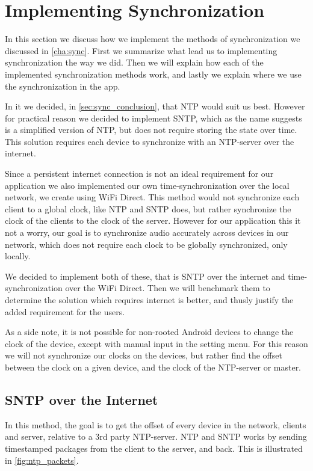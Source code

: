 \section{Implementing Synchronization}\label{sec:impl_sync}
In this section we discuss how we implement the methods of synchronization we discussed in \cref{cha:sync}.
First we summarize what lead us to implementing synchronization the way we did.
Then we will explain how each of the implemented synchronization methods work, and lastly we explain where we use the synchronization in the app.

In it we decided, in \cref{sec:sync_conclusion}, that NTP would suit us best.
However for practical reason we decided to implement \ac{SNTP}, which as the name suggests is a simplified version of \ac{NTP}, but does not require storing the state over time.
This solution requires each device to synchronize with an \ac{NTP}-server over the internet.

Since a persistent internet connection is not an ideal requirement for our application we also implemented our own time-synchronization over the local network, we create using WiFi Direct.
This method would not synchronize each client to a global clock, like \ac{NTP} and \ac{SNTP} does, but rather synchronize the clock of the clients to the clock of the server.
However for our application this it not a worry, our goal is to synchronize audio accurately across devices in our network, which does not require each clock to be globally synchronized, only locally.

We decided to implement both of these, that is \ac{SNTP} over the internet and time-synchronization over the WiFi Direct.
Then we will benchmark them to determine the solution which requires internet is better, and thusly justify the added requirement for the users.

As a side note, it is not possible for non-rooted Android devices to change the clock of the device, except with manual input in the setting menu.
For this reason we will not synchronize our clocks on the devices, but rather find the offset between the clock on a given device, and the clock of the \ac{NTP}-server or master.

\subsection{\ac{SNTP} over the Internet}
In this method, the goal is to get the offset of every device in the network, clients and server, relative to a 3rd party \ac{NTP}-server.
\ac{NTP} and \ac{SNTP} works by sending timestamped packages from the client to the server, and back.
This is illustrated in \cref{fig:ntp_packets}.

